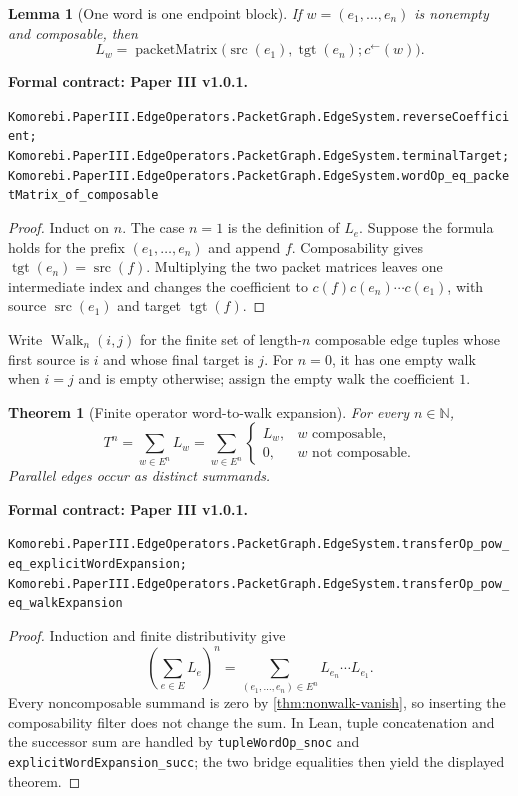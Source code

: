 \documentclass[11pt,a4paper]{article}
\newtheorem{theorem}{Theorem}[section]
\theoremstyle{plain}
\newtheorem{lemma}[lemma]{Lemma}
\theoremstyle{definition}
\theoremstyle{remark}
\newcommand{\N}{\mathbb N}
\newcommand{\src}{\operatorname{src}}
\newcommand{\tgt}{\operatorname{tgt}}
\newcommand{\Walk}{\operatorname{Walk}}
\newcommand{\leanname}[1]{\nolinkurl{#1}}
\newcommand{\statusleanthree}[1]{\par\smallskip\noindent\begin{minipage}{\linewidth}{\color{leanblue}\textbf{Formal contract: Paper III v1.0.1.}}\par\begingroup\small\raggedright\leanname{#1}\par\endgroup\end{minipage}\par\smallskip}
\begin{document}
\begin{lemma}[One word is one endpoint block]
\label{lem:word-endpoint}
If $w=(e_1,\ldots,e_n)$ is nonempty and composable, then
\[
  L_w
  =
  \operatorname{packetMatrix}
  \bigl(\src(e_1),\tgt(e_n);c^\leftarrow(w)\bigr).
\]
\end{lemma}
\statusleanthree{Komorebi.PaperIII.EdgeOperators.PacketGraph.EdgeSystem.reverseCoefficient; Komorebi.PaperIII.EdgeOperators.PacketGraph.EdgeSystem.terminalTarget; Komorebi.PaperIII.EdgeOperators.PacketGraph.EdgeSystem.wordOp_eq_packetMatrix_of_composable}

\begin{proof}
Induct on $n$.  The case $n=1$ is the definition of $L_e$.  Suppose the
formula holds for the prefix $(e_1,\ldots,e_n)$ and append $f$.  Composability
gives $\tgt(e_n)=\src(f)$.  Multiplying the two packet matrices leaves one
intermediate index and changes the coefficient to
$c(f)c(e_n)\cdots c(e_1)$, with source $\src(e_1)$ and target $\tgt(f)$.
\end{proof}

Write $\Walk_n(i,j)$ for the finite set of length-$n$ composable edge tuples
whose first source is $i$ and whose final target is $j$.  For $n=0$, it has
one empty walk when $i=j$ and is empty otherwise; assign the empty walk the
coefficient $1$.

\begin{theorem}[Finite operator word-to-walk expansion]
\label{thm:word-to-walk}
For every $n\in\N$,
\[
  \boxed{
  T^n
  =
  \sum_{w\in E^n}L_w
  =
  \sum_{w\in E^n}
  \begin{cases}
  L_w,&w\text{ composable},\\
  0,&w\text{ not composable}.
  \end{cases}
  }
\]
Parallel edges occur as distinct summands.
\end{theorem}
\statusleanthree{Komorebi.PaperIII.EdgeOperators.PacketGraph.EdgeSystem.transferOp_pow_eq_explicitWordExpansion; Komorebi.PaperIII.EdgeOperators.PacketGraph.EdgeSystem.transferOp_pow_eq_walkExpansion}

\begin{proof}
Induction and finite distributivity give
\[
\left(\sum_{e\in E}L_e\right)^n
=
\sum_{(e_1,\ldots,e_n)\in E^n}L_{e_n}\cdots L_{e_1}.
\]
Every noncomposable summand is zero by
\cref{thm:nonwalk-vanish}, so inserting the composability filter does not
change the sum.  In Lean, tuple concatenation and the successor sum are
handled by \leanname{tupleWordOp_snoc} and
\leanname{explicitWordExpansion_succ}; the two bridge equalities then yield
the displayed theorem.
\end{proof}
\end{document}
